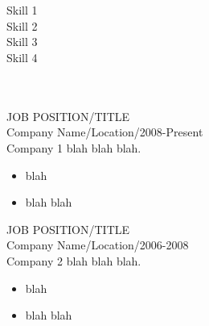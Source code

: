 \documentclass[12pt, a4paper, conference]{IEEEtran}
\begin{document}
\begin{minipage}[t][5cm][t]{0.3\textwidth}
{}\\
\\
Skill 1\\

Skill 2\\

Skill 3\\

Skill 4

\end{minipage}
\quad
\vrule height 4ex width 1pt
\quad
\begin{minipage}[t][5cm][t]{0.6\textwidth}
{}\\
\\
JOB POSITION/TITLE\\
Company Name/Location/2008-Present\\
Company 1 blah blah blah.
\begin{itemize}
\item blah
\item blah blah\\
\end{itemize}

JOB POSITION/TITLE\\
Company Name/Location/2006-2008\\
Company 2 blah blah blah.
\begin{itemize}
\item blah
\item blah blah
\end{itemize}

\end{minipage}

\noindent\makebox[1cm]{\rule{\paperwidth}{1pt}}
\end{document}
